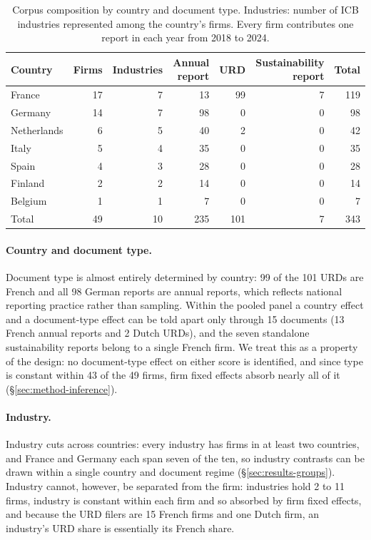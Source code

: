 \begin{table}[htbp]
\centering
\small
\caption{Corpus composition by country and document type. Industries: number
of ICB industries represented among the country's firms. Every firm
contributes one report in each year from 2018 to 2024.}
\label{tab:data-composition}
\begin{tabular}{@{}lrrrrrr@{}}
\toprule
Country & Firms & Industries & Annual report & URD & Sustainability report & Total \\
\midrule
France      & 17 & 7  & 13  & 99  & 7 & 119 \\
Germany     & 14 & 7  & 98  & 0   & 0 & 98  \\
Netherlands & 6  & 5  & 40  & 2   & 0 & 42  \\
Italy       & 5  & 4  & 35  & 0   & 0 & 35  \\
Spain       & 4  & 3  & 28  & 0   & 0 & 28  \\
Finland     & 2  & 2  & 14  & 0   & 0 & 14  \\
Belgium     & 1  & 1  & 7   & 0   & 0 & 7   \\
\midrule
Total       & 49 & 10 & 235 & 101 & 7 & 343 \\
\bottomrule
\end{tabular}
\end{table}

\paragraph{Country and document type.} Document type is almost entirely
determined by country: 99 of the 101 URDs are French and all 98 German reports
are annual reports, which reflects national reporting practice rather than
sampling. Within the pooled panel a country effect and a document-type effect
can be told apart only through 15 documents (13 French annual reports and 2
Dutch URDs), and the seven standalone sustainability reports belong to a
single French firm. We treat this as a property of the design: no
document-type effect on either score is identified, and since type is constant
within 43 of the 49 firms, firm fixed effects absorb nearly all of it
(\S\ref{sec:method-inference}).

\paragraph{Industry.} Industry cuts across countries: every industry has firms
in at least two countries, and France and Germany each span seven of the ten,
so industry contrasts can be drawn within a single country and document regime
(\S\ref{sec:results-groups}). Industry cannot, however, be separated from the
firm: industries hold 2 to 11 firms, industry is constant within each firm and
so absorbed by firm fixed effects, and because the URD filers are 15 French
firms and one Dutch firm, an industry's URD share is essentially its French
share.
